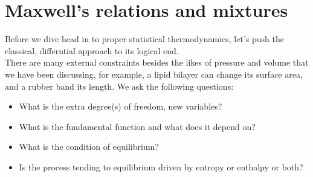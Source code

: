 \section{Maxwell's relations and mixtures}
Before we dive head in to proper statistical thermodynamics, let's push the classical, differntial approach to its logical end. \\
There are many external constraints besides the likes of pressure and volume that we have been discussing, 
for example, a lipid bilayer can change its surface area, and a rubber band its length. We ask the following questions: 
\begin{itemize}
	\item What is the extra degree(s) of freedom, \ie new variables?
	\item What is the fundamental function and what does it depend on?
	\item What is the condition of equilibrium?
	\item Is the process tending to equilibrium driven by entropy or enthalpy or both? 
\end{itemize}

